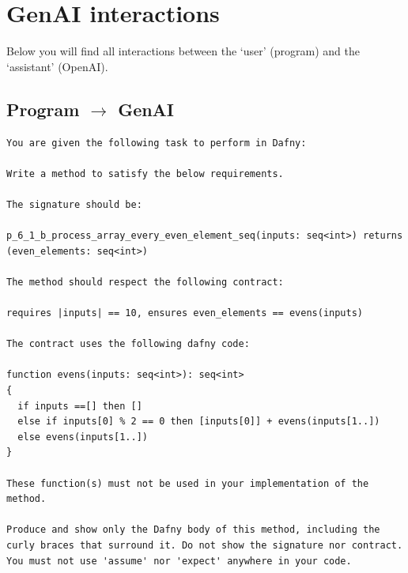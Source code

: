 \documentclass{article}
\begin{document}
\section*{GenAI interactions}
Below you will find all interactions between the `user' (program) and the `assistant' (OpenAI).
\subsection*{Program $\rightarrow$ GenAI}
\begin{lstlisting}
You are given the following task to perform in Dafny:

Write a method to satisfy the below requirements.

The signature should be:

p_6_1_b_process_array_every_even_element_seq(inputs: seq<int>) returns (even_elements: seq<int>)

The method should respect the following contract:

requires |inputs| == 10, ensures even_elements == evens(inputs)

The contract uses the following dafny code:

function evens(inputs: seq<int>): seq<int>
{
  if inputs ==[] then []
  else if inputs[0] % 2 == 0 then [inputs[0]] + evens(inputs[1..])
  else evens(inputs[1..])
}

These function(s) must not be used in your implementation of the method.

Produce and show only the Dafny body of this method, including the curly braces that surround it. Do not show the signature nor contract. You must not use 'assume' nor 'expect' anywhere in your code.
\end{lstlisting}
\end{document}

